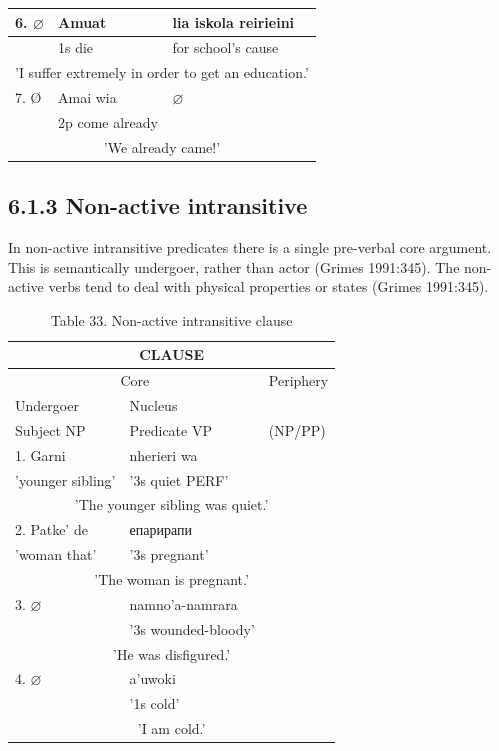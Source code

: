 \documentclass[10pt]{article}
\begin{document}
\begin{table}[h]
\begin{center}
\begin{tabular}{|l|l|l|l|}
\hline
6. \(\varnothing\) & Amuat & lia iskola reirieini &  \\
\hline
 & 1s die & for school's cause &  \\
\hline
\multicolumn{4}{|c|}{'I suffer extremely in order to get an education.'} \\
\hline
7. Ø & Amai wia & \(\varnothing\) &  \\
\hline
 & 2p come already &  &  \\
\hline
\multicolumn{4}{|c|}{'We already came!'} \\
\hline
\end{tabular}
\end{center}
\end{table}

\subsection*{6.1.3 Non-active intransitive}
In non-active intransitive predicates there is a single pre-verbal core argument. This is semantically undergoer, rather than actor (Grimes 1991:345). The non-active verbs tend to deal with physical properties or states (Grimes 1991:345).

\begin{table}[h]
\begin{center}
\captionsetup{labelformat=empty}
\caption{Table 33. Non-active intransitive clause}
\begin{tabular}{|l|l|l|}
\hline
\multicolumn{3}{|c|}{CLAUSE} \\
\hline
\multicolumn{2}{|c|}{Core} & Periphery \\
\hline
Undergoer & Nucleus &  \\
\hline
Subject NP & Predicate VP & (NP/PP) \\
\hline
1. Garni & nherieri wa &  \\
\hline
'younger sibling' & '3s quiet PERF' &  \\
\hline
\multicolumn{3}{|c|}{'The younger sibling was quiet.'} \\
\hline
2. Patke' de & епарирапи &  \\
\hline
'woman that' & '3s pregnant' &  \\
\hline
\multicolumn{3}{|c|}{'The woman is pregnant.'} \\
\hline
3. \(\varnothing\) & namno'a-namrara &  \\
\hline
 & '3s wounded-bloody' &  \\
\hline
\multicolumn{3}{|c|}{'He was disfigured.'} \\
\hline
4. \(\varnothing\) & a'uwoki &  \\
\hline
 & '1s cold' &  \\
\hline
\multicolumn{3}{|c|}{'I am cold.'} \\
\hline
\end{tabular}
\end{center}
\end{table}
\end{document}
